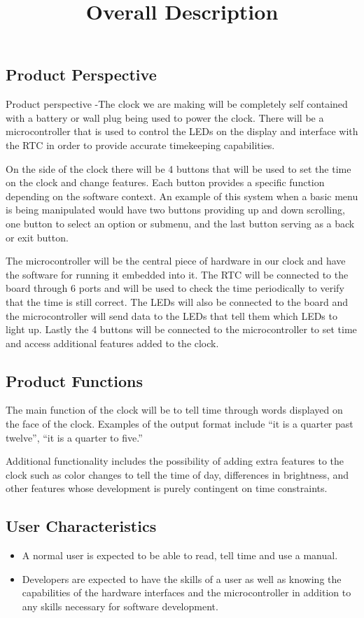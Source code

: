 \documentclass[10pt,draftclsnofoot,onecolumn]{IEEEtran}
\begin{document}
\newpage
\title{Overall Description}
\subsection{Product Perspective}
Product perspective -The clock we are making will be completely self contained with a battery
or wall plug being used to power the clock. There will be a microcontroller that is used to
control the LEDs on the display and interface with the RTC in order to provide accurate
timekeeping capabilities.

On the side of the clock there will be 4 buttons that will be used to set the time on the
clock and change features. Each button provides a specific function depending on the software
context. An example of this system when a basic menu is being manipulated would have two
buttons providing up and down scrolling, one button to select an option or submenu, and the
last button serving as a back or exit button.

The microcontroller will be the central piece of hardware in our clock and have the software
for running it embedded into it. The RTC will be connected to the board through 6 ports and
will be used to check the time periodically to verify that the time is still correct. The LEDs
will also be connected to the board and the microcontroller will send data to the LEDs that
tell them which LEDs to light up. Lastly the 4 buttons will be connected to the
microcontroller to set time and access additional features added to the clock.

\subsection{Product Functions}
The main function of the clock will be to tell time through words displayed on the face of the
clock. Examples of the output format include “it is a quarter past twelve”, “it is a quarter to
five.”

Additional functionality includes the possibility of adding extra features to the clock such as
color changes to tell the time of day, differences in brightness, and other features whose
development is purely contingent on time constraints.

\subsection{User Characteristics}
\begin{itemize}
  \item A normal user is expected to be able to read, tell time and use a manual.
  \item Developers are expected to have the skills of a user as well as knowing the
  capabilities of the hardware interfaces and the microcontroller in addition to any skills
  necessary for software development.
\end{itemize}
\end{document}
